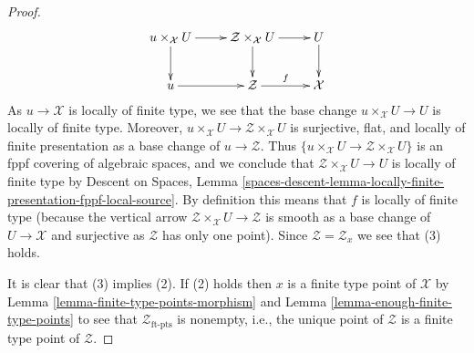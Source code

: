 \documentclass[10pt,a4paper]{amsart}
\theoremstyle{plain}
\theoremstyle{definition}
\theoremstyle{remark}
\numberwithin{equation}{subsection}
\begin{document}
\begin{proof}
$$
\xymatrix{
u \times_\mathcal{X} U \ar[d] \ar[r] &
\mathcal{Z} \times_\mathcal{X} U \ar[r] \ar[d] & U \ar[d] \\
u \ar[r] & \mathcal{Z} \ar[r]^f & \mathcal{X}
}
$$
As $u \to \mathcal{X}$ is locally of finite type, we see that the base change
$u \times_\mathcal{X} U \to U$ is locally of finite type. Moreover,
$u \times_\mathcal{X} U \to \mathcal{Z} \times_\mathcal{X} U$ is
surjective, flat, and locally of finite presentation as a base change of
$u \to \mathcal{Z}$. Thus
$\{u \times_\mathcal{X} U \to \mathcal{Z} \times_\mathcal{X} U\}$
is an fppf covering of algebraic spaces, and we conclude that
$\mathcal{Z} \times_\mathcal{X} U \to U$ is locally of finite type by
Descent on Spaces, Lemma
\ref{spaces-descent-lemma-locally-finite-presentation-fppf-local-source}.
By definition this means that $f$ is locally of finite type (because the
vertical arrow $\mathcal{Z} \times_\mathcal{X} U \to \mathcal{Z}$ is smooth
as a base change of $U \to \mathcal{X}$ and surjective as $\mathcal{Z}$ has
only one point). Since $\mathcal{Z} = \mathcal{Z}_x$ we see that (3) holds.

\medskip\noindent
It is clear that (3) implies (2).
If (2) holds then $x$ is a finite type point of $\mathcal{X}$ by
Lemma \ref{lemma-finite-type-points-morphism}
and
Lemma \ref{lemma-enough-finite-type-points}
to see that $\mathcal{Z}_{\text{ft-pts}}$ is nonempty, i.e., the
unique point of $\mathcal{Z}$ is a finite type point of $\mathcal{Z}$.
\end{proof}
\end{document}
